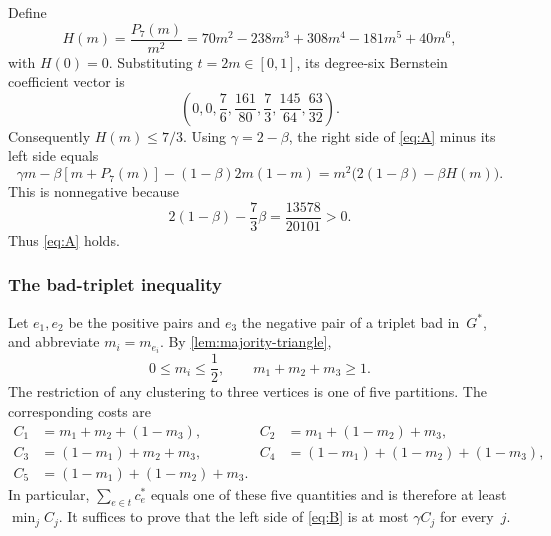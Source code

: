 \documentclass[11pt,letterpaper]{article}
\theoremstyle{definition}
\theoremstyle{remark}
\newcommand{\1}{\mathbf{1}}
\begin{document}
Define
\[
 H(m)=\frac{P_7(m)}{m^2}
 =70m^2-238m^3+308m^4-181m^5+40m^6,
\]
with $H(0)=0$.  Substituting $t=2m\in[0,1]$, its degree-six Bernstein coefficient vector is
\[
 \left(0,0,\frac76,\frac{161}{80},\frac73,
              \frac{145}{64},\frac{63}{32}\right).
\]
Consequently $H(m)\le7/3$.  Using $\gamma=2-\beta$, the right side of \cref{eq:A} minus its left side equals
\[
 \gamma m-\beta[m+P_7(m)]-(1-\beta)2m(1-m)
 =m^2\bigl(2(1-\beta)-\beta H(m)\bigr).
\]
This is nonnegative because
\[
 2(1-\beta)-\frac73\beta
 =\frac{13578}{20101}>0.
\]
Thus \cref{eq:A} holds.

\subsubsection{The bad-triplet inequality}

Let $e_1,e_2$ be the positive pairs and $e_3$ the negative pair of a triplet bad in~$G^*$, and abbreviate $m_i=m_{e_i}$.  By \cref{lem:majority-triangle},
\begin{equation}\label{eq:mass-domain}
 0\le m_i\le\frac12,
 \qquad
 m_1+m_2+m_3\ge1.
\end{equation}
The restriction of any clustering to three vertices is one of five partitions.  The corresponding costs are
\begin{align}
 C_1&=m_1+m_2+(1-m_3),&
 C_2&=m_1+(1-m_2)+m_3,\nonumber\\
 C_3&=(1-m_1)+m_2+m_3,&
 C_4&=(1-m_1)+(1-m_2)+(1-m_3),\label{eq:five-costs}\\
 C_5&=(1-m_1)+(1-m_2)+m_3.\nonumber
\end{align}
In particular, $\sum_{e\in t}c_e^*$ equals one of these five quantities and is therefore at least $\min_jC_j$.  It suffices to prove that the left side of \cref{eq:B} is at most $\gamma C_j$ for every~$j$.
\end{document}

